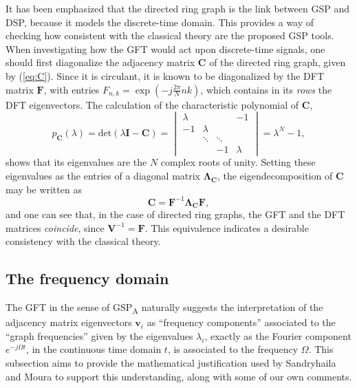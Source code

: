 It has been emphasized that the directed ring graph is the link between GSP and DSP, because it models the discrete-time domain. This provides a way of checking how consistent with the classical theory are the proposed GSP tools. When investigating how the GFT would act upon discrete-time signals, one should first diagonalize the adjacency matrix $ \mathbf{C} $ of the directed ring graph, given by (\ref{eq:C}). Since it is circulant, it is known to be diagonalized by the DFT matrix $ \mathbf{F} $, with entries $ F_{n,k} = \exp \left( -j\frac{2 \pi}{N} nk \right) $, which contains in its \emph{rows} the DFT eigenvectors. The calculation of the characteristic polynomial of $ \mathbf{C} $,
\begin{equation}
p_{\mathbf{C}}(\lambda) = \text{det} (\lambda \mathbf{I} - \mathbf{C}) =
\begin{vmatrix}
\lambda &  &  &   -1\\ 
-1 & \lambda &   & \\ 
&   \ddots & \ddots & \\ 
&  &   -1 & \lambda
\end{vmatrix}
=\lambda^N - 1,
\end{equation}
shows that its eigenvalues are the $ N $ complex roots of unity. Setting these eigenvalues as the entries of a diagonal matrix $ \mathbf{\Lambda}_{\mathbf{C}} $, the eigendecomposition of $ \mathbf{C} $ may be written as
\begin{equation}\label{eq:diag_C}
\mathbf{C} = \mathbf{F}^{-1} \mathbf{\Lambda}_{\mathbf{C}} \mathbf{F},
\end{equation}
and one can see that, in the case of directed ring graphs, the GFT and the DFT matrices \emph{coincide}, since $ \mathbf{V}^{-1} = \mathbf{F} $. This equivalence indicates a desirable consistency with the classical theory.

 \subsection{The frequency domain}

The GFT in the sense of GSP\textsubscript{A} naturally suggests the interpretation of the adjacency matrix eigenvectors $ \mathbf{v}_i $ as ``frequency components'' associated to the ``graph frequencies'' given by the eigenvalues $ \lambda_i $, exactly as the Fourier component $ e^{-j \Omega t} $, in the continuous time domain $ t $, is associated to the frequency $ \Omega $. This subsection aims to provide the mathematical justification used by Sandryhaila and Moura \cite{sandryhaila2014frequency} to support this understanding, along with some of our own comments.

